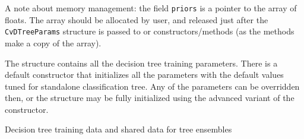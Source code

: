 \begin{description}
{A note about memory management: the field \texttt{priors} is a pointer to the array of floats. The array should be allocated by user, and released just after the \texttt{CvDTreeParams} structure is passed to  or  constructors/methods (as the methods make a copy of the array).}
\end{description}

The structure contains all the decision tree training parameters. There is a default constructor that initializes all the parameters with the default values tuned for standalone classification tree. Any of the parameters can be overridden then, or the structure may be fully initialized using the advanced variant of the constructor.



Decision tree training data and shared data for tree ensembles

